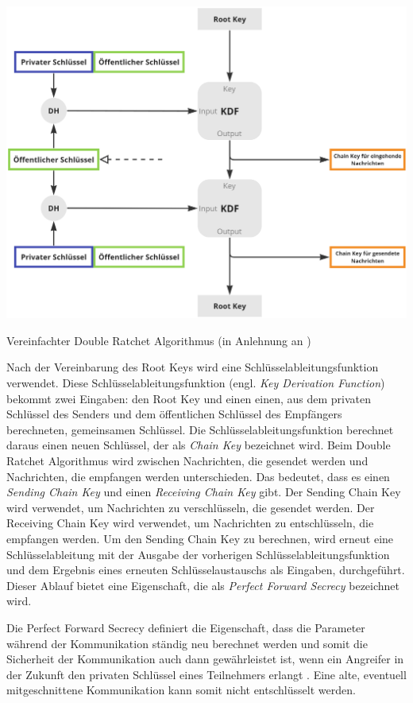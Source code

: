 \begin{center}
    \captionsetup{type=figure}
    \includegraphics[width=0.8\linewidth]{images/double_ratchet_altered.png}
    \caption{Vereinfachter Double Ratchet Algorithmus (in Anlehnung an \cite{Signal_DoubleRatchet})}
    \label{fig:double_ratchet}
\end{center}


\noindent Nach der Vereinbarung des Root Keys wird eine Schlüsselableitungsfunktion verwendet. Diese Schlüsselableitungsfunktion (engl. \textit{Key Derivation Function}) bekommt zwei Eingaben: den Root Key und einen einen, aus dem privaten Schlüssel des Senders und dem öffentlichen Schlüssel des Empfängers berechneten, gemeinsamen Schlüssel. Die Schlüsselableitungsfunktion berechnet daraus einen neuen Schlüssel, der als \textit{Chain Key} bezeichnet wird. Beim Double Ratchet Algorithmus wird zwischen Nachrichten, die gesendet werden und Nachrichten, die empfangen werden unterschieden. Das bedeutet, dass es einen \textit{Sending Chain Key} und einen \textit{Receiving Chain Key} gibt. Der Sending Chain Key wird verwendet, um Nachrichten zu verschlüsseln, die gesendet werden. Der Receiving Chain Key wird verwendet, um Nachrichten zu entschlüsseln, die empfangen werden. Um den Sending Chain Key zu berechnen, wird erneut eine Schlüsselableitung mit der Ausgabe der vorherigen Schlüsselableitungsfunktion und dem Ergebnis eines erneuten Schlüsselaustauschs als Eingaben, durchgeführt. Dieser Ablauf bietet eine Eigenschaft, die als \textit{Perfect Forward Secrecy} bezeichnet wird.

Die Perfect Forward Secrecy definiert die Eigenschaft, dass die Parameter während der Kommunikation ständig neu berechnet werden und somit die Sicherheit der Kommunikation auch dann gewährleistet ist, wenn ein Angreifer in der Zukunft den privaten Schlüssel eines Teilnehmers erlangt \parencite{ElektronikKompendium_PFS}. Eine alte, eventuell mitgeschnittene Kommunikation kann somit nicht entschlüsselt werden.
